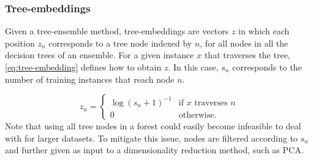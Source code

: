 \documentclass[conference,compsoc]{IEEEtran}
\newcommand{\el}[1]{_{#1}}
\begin{document}
\subsubsection{Tree-embeddings}


Given a tree-ensemble method, tree-embeddings are vectors $z$ in which each position $z\el{n}$ corresponds to a tree node indexed by $n$, for all nodes in all the decision trees of an ensemble.
%
For a given instance $x$ that traverses the tree, \autoref{eq:tree-embedding} defines how to obtain $z$. In this case, $s_n$ corresponds to the number of training instances that reach node $n$. 


%
\begin{equation}
    z\el{n} = \begin{cases}
        \log (s_n + 1)^{-1} & \text{if $x$ traverses $n$} \\%
        0 & \text{otherwise.}
    \end{cases}
    \label{eq:tree-embedding}
\end{equation}
%
Note that using all tree nodes in a forest could easily become infeasible to deal with for larger datasets. To mitigate this issue, nodes are filtered according to $s_n$ and further given as input to a dimensionality reduction method, such as PCA.
\end{document}
